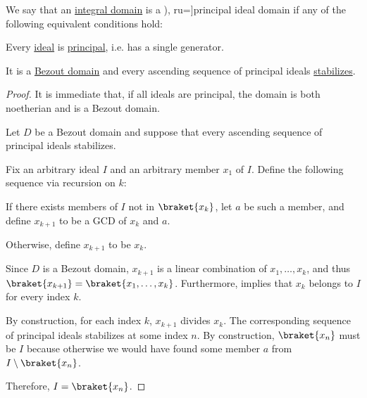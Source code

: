 \begin{definition}\label{def:principal_ideal_domain}
  We say that an \hyperref[def:integral_domain]{integral domain} is a \term[bg=област на главни идеали (\cite[def. VI.3]{ГеновИПр1991Алгебра}), ru=\cite[def. 9.3]{Винберг2014Алгебра}]{principal ideal domain} if any of the following equivalent conditions hold:
  \begin{thmenum}
     Every \hyperref[def:semiring_ideal]{ideal} is \hyperref[def:semiring_ideal/principal]{principal}, i.e. has a single generator.

     It is a \hyperref[def:bezout_domain]{Bezout domain} and every ascending sequence of principal ideals \hyperref[def:stabilizing_sequence]{stabilizes}.
  \end{thmenum}
\end{definition}
\begin{proof}
   It is immediate that, if all ideals are principal, the domain is both noetherian and is a Bezout domain.

   Let \( D \) be a Bezout domain and suppose that every ascending sequence of principal ideals stabilizes.

  Fix an arbitrary ideal \( I \) and an arbitrary member \( x_1 \) of \( I \). Define the following sequence via recursion on \( k \):
  \begin{displayquote}
    If there exists members of \( I \) not in \( \braket{ x_k } \), let \( a \) be such a member, and define \( x_{k+1} \) to be a GCD of \( x_k \) and \( a \).

    Otherwise, define \( x_{k+1} \) to be \( x_k \).
  \end{displayquote}

  Since \( D \) is a Bezout domain, \( x_{k+1} \) is a linear combination of \( x_1, \ldots, x_k \), and thus \( \braket{ x_{k+1} } = \braket{ x_1, \ldots, x_k } \). Furthermore,  implies that \( x_k \) belongs to \( I \) for every index \( k \).

  By construction, for each index \( k \), \( x_{k+1} \) divides \( x_k \). The corresponding sequence of principal ideals stabilizes at some index \( n \). By construction, \( \braket{ x_n } \) must be \( I \) because otherwise we would have found some member \( a \) from \( I \setminus \braket{ x_n } \).

  Therefore, \( I = \braket{ x_n } \).
\end{proof}

